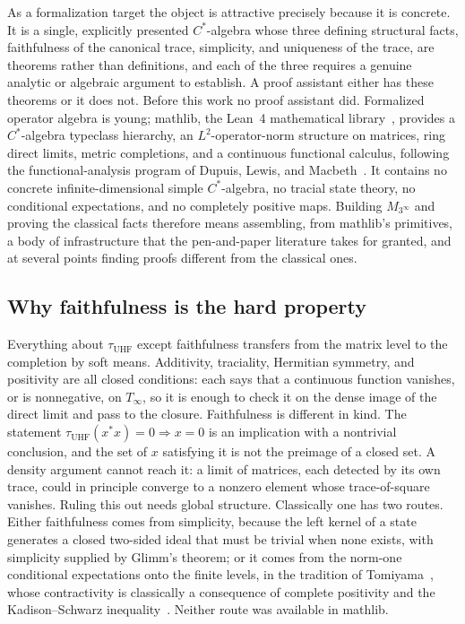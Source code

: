\documentclass[11pt,reqno]{amsart}
\theoremstyle{plain}
\theoremstyle{definition}
\theoremstyle{remark}
\newcommand{\Tinf}{T_\infty}
\newcommand{\tuhf}{\tau_{\mathrm{UHF}}}
\begin{document}
As a formalization target the object is attractive precisely because it is
concrete. It is a single, explicitly presented $C^*$-algebra whose three
defining structural facts, faithfulness of the canonical trace, simplicity,
and uniqueness of the trace, are theorems rather than definitions, and each
of the three requires a genuine analytic or algebraic argument to
establish. A proof assistant either has these theorems or it does not.
Before this work no proof assistant did. Formalized operator algebra is
young; mathlib, the Lean~4 mathematical library~\cite{mathlib2020,
moura-ullrich2021}, provides a $C^*$-algebra typeclass hierarchy, an
$L^2$-operator-norm structure on matrices, ring direct limits, metric
completions, and a continuous functional calculus, following the
functional-analysis program of Dupuis, Lewis, and
Macbeth~\cite{dupuis-lewis-macbeth2022}. It contains no concrete
infinite-dimensional simple $C^*$-algebra, no tracial state theory, no
conditional expectations, and no completely positive maps. Building
$M_{3^\infty}$ and proving the classical facts therefore means assembling,
from mathlib's primitives, a body of infrastructure that the pen-and-paper
literature takes for granted, and at several points finding proofs
different from the classical ones.

\subsection*{Why faithfulness is the hard property}

Everything about $\tuhf$ except faithfulness transfers from the matrix
level to the completion by soft means. Additivity, traciality, Hermitian
symmetry, and positivity are all closed conditions: each says that a
continuous function vanishes, or is nonnegative, on $\Tinf$, so it is
enough to check it on the dense image of the direct limit and pass to the
closure. Faithfulness is different in kind. The statement
$\tuhf(x^*x) = 0 \Rightarrow x = 0$ is an implication with a nontrivial
conclusion, and the set of $x$ satisfying it is not the preimage of a
closed set. A density argument cannot reach it: a limit of matrices, each
detected by its own trace, could in principle converge to a nonzero element
whose trace-of-square vanishes. Ruling this out needs global structure.
Classically one has two routes. Either faithfulness comes from simplicity,
because the left kernel of a state generates a closed two-sided ideal that
must be trivial when none exists, with simplicity supplied by Glimm's
theorem; or it comes from the norm-one conditional expectations onto the
finite levels, in the tradition of Tomiyama~\cite{tomiyama1957}, whose
contractivity is classically a consequence of complete positivity and the
Kadison--Schwarz inequality~\cite{kadison1952}. Neither route was available
in mathlib.
\end{document}
